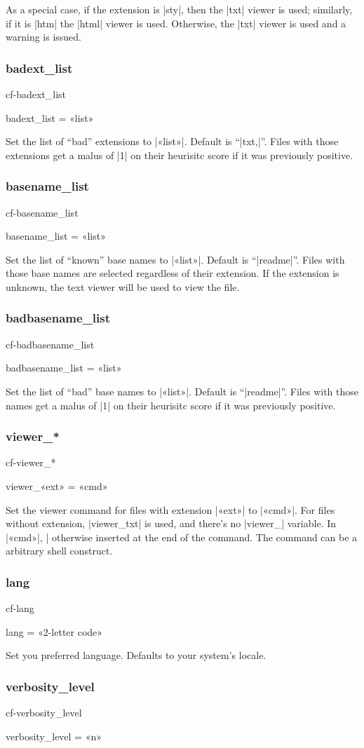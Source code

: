 \documentclass[a4paper, oneside]{scrartcl}
\newif\ifframed
\newenvironment{cmdsubsub}[2]{%
  \framedfalse \commandes\subsubsection{#1}{#2}%
  }{%
  \endcommandes}
\begin{document}
As a special case, if the extension is |sty|, then the |txt| viewer is used;
similarly, if it is |htm| the |html| viewer is used. Otherwise, the |txt|
viewer is used and a warning is issued.

\begin{cmdsubsub}{badext_list}{cf-badext_list}
  badext_list = «list»
\end{cmdsubsub}

Set the list of ``bad'' extensions to |«list»|.  Default is ``|txt,|''. Files
with those extensions get a malus of |1| on their heurisitc score if it was
previously positive.

\begin{cmdsubsub}{basename_list}{cf-basename_list}
  basename_list = «list»
\end{cmdsubsub}

Set the list of ``known'' base names to |«list»|.  Default is ``|readme|''.
Files with those base names are selected regardless of their extension. If the
extension is unknown, the text viewer will be used to view the file.

\begin{cmdsubsub}{badbasename_list}{cf-badbasename_list}
  badbasename_list = «list»
\end{cmdsubsub}

Set the list of ``bad'' base names to |«list»|.  Default is ``|readme|''. Files
with those names get a malus of |1| on their heurisitc score if it was
previously positive.

\begin{cmdsubsub}{viewer_*}{cf-viewer_*}
  viewer_«ext» = «cmd»
\end{cmdsubsub}

Set the viewer command for files with extension |«ext»| to |«cmd»|. For files
without extension, |viewer_txt| is used, and there's no |viewer_| variable.
In |«cmd»|, |%
otherwise inserted at the end of the command.  The command can be a arbitrary
shell construct.

\begin{cmdsubsub}{lang}{cf-lang}
  lang = «2-letter code»
\end{cmdsubsub}

Set you preferred language. Defaults to your system's locale.

\begin{cmdsubsub}{verbosity_level}{cf-verbosity_level}
  verbosity_level = «n»
\end{cmdsubsub}
\end{document}
